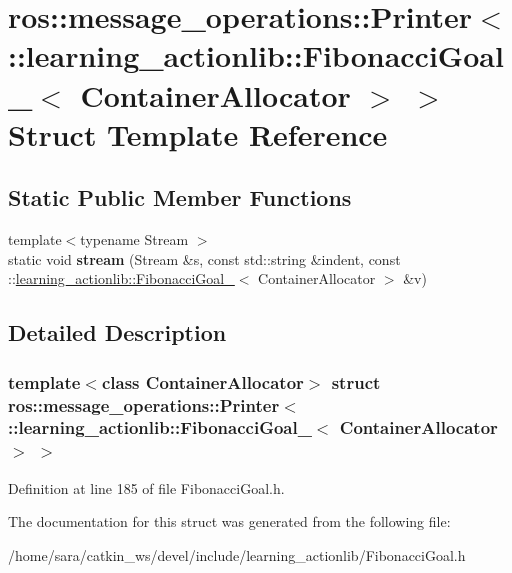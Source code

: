 \hypertarget{structros_1_1message__operations_1_1Printer_3_01_1_1learning__actionlib_1_1FibonacciGoal___3_01ContainerAllocator_01_4_01_4}{}\section{ros\+:\+:message\+\_\+operations\+:\+:Printer$<$ \+:\+:learning\+\_\+actionlib\+:\+:Fibonacci\+Goal\+\_\+$<$ Container\+Allocator $>$ $>$ Struct Template Reference}
\label{structros_1_1message__operations_1_1Printer_3_01_1_1learning__actionlib_1_1FibonacciGoal___3_01ContainerAllocator_01_4_01_4}
\subsection*{Static Public Member Functions}
\begin{DoxyCompactItemize}
\item 
\mbox{\label{structros_1_1message__operations_1_1Printer_3_01_1_1learning__actionlib_1_1FibonacciGoal___3_01ContainerAllocator_01_4_01_4_ad4e2ebcced457479553f79d53a38c7c5}} 
{\footnotesize template$<$typename Stream $>$ }\\static void {\bfseries stream} (Stream \&s, const std\+::string \&indent, const \+::\hyperlink{structlearning__actionlib_1_1FibonacciGoal__}{learning\+\_\+actionlib\+::\+Fibonacci\+Goal\+\_\+}$<$ Container\+Allocator $>$ \&v)
\end{DoxyCompactItemize}


\subsection{Detailed Description}
\subsubsection*{template$<$class Container\+Allocator$>$\newline
struct ros\+::message\+\_\+operations\+::\+Printer$<$ \+::learning\+\_\+actionlib\+::\+Fibonacci\+Goal\+\_\+$<$ Container\+Allocator $>$ $>$}



Definition at line 185 of file Fibonacci\+Goal.\+h.



The documentation for this struct was generated from the following file\+:\begin{DoxyCompactItemize}
\item 
/home/sara/catkin\+\_\+ws/devel/include/learning\+\_\+actionlib/Fibonacci\+Goal.\+h\end{DoxyCompactItemize}
